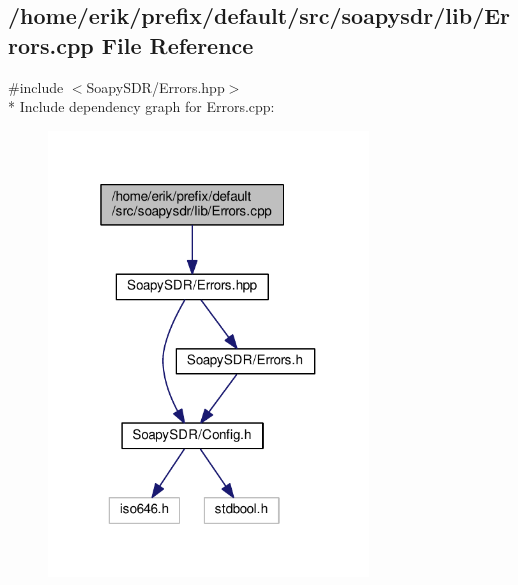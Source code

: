 \subsection{/home/erik/prefix/default/src/soapysdr/lib/\+Errors.cpp File Reference}
\label{Errors_8cpp}
{\ttfamily \#include $<$Soapy\+S\+D\+R/\+Errors.\+hpp$>$}\\*
Include dependency graph for Errors.\+cpp\+:
\nopagebreak
\begin{figure}[H]
\begin{center}
\leavevmode
\includegraphics[width=241pt]{d3/d2a/Errors_8cpp__incl}
\end{center}
\end{figure}
